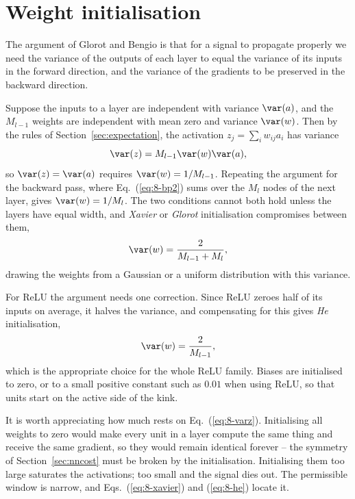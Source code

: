 \section{Weight initialisation}
\label{sec:initialisation}

The argument of Glorot and Bengio is that for a signal to propagate properly we
need the variance of the outputs of each layer to equal the variance of its
inputs in the forward direction, and the variance of the gradients to be
preserved in the backward direction.

Suppose the inputs to a layer are independent with variance $\var(a)$, and the
$M_{l-1}$ weights are independent with mean zero and variance $\var(w)$.  Then
by the rules of Section~\ref{sec:expectation}, the activation
$z_j=\sum_i w_{ij}a_i$ has variance
\begin{equation}
  \var(z) = M_{l-1}\var(w)\var(a),
  \label{eq:8-varz}
\end{equation}
so $\var(z)=\var(a)$ requires $\var(w)=1/M_{l-1}$.  Repeating the argument for
the backward pass, where Eq.~(\ref{eq:8-bp2}) sums over the $M_l$ nodes of the
next layer, gives $\var(w)=1/M_l$.  The two conditions cannot both hold unless
the layers have equal width, and \emph{Xavier} or \emph{Glorot}
initialisation compromises between them,
\begin{equation}
  \var(w) = \frac{2}{M_{l-1}+M_l},
  \label{eq:8-xavier}
\end{equation}
drawing the weights from a Gaussian or a uniform distribution with this
variance.

For ReLU the argument needs one correction.  Since ReLU zeroes half of its
inputs on average, it halves the variance, and compensating for this gives
\emph{He} initialisation,
\begin{equation}
  \var(w) = \frac{2}{M_{l-1}},
  \label{eq:8-he}
\end{equation}
which is the appropriate choice for the whole ReLU family.  Biases are
initialised to zero, or to a small positive constant such as $0.01$ when using
ReLU, so that units start on the active side of the kink.

It is worth appreciating how much rests on Eq.~(\ref{eq:8-varz}).  Initialising
all weights to zero would make every unit in a layer compute the same thing and
receive the same gradient, so they would remain identical forever -- the
symmetry of Section~\ref{sec:nncost} must be broken by the initialisation.
Initialising them too large saturates the activations; too small and the signal
dies out. The permissible window is narrow, and Eqs.~(\ref{eq:8-xavier}) and
(\ref{eq:8-he}) locate it.

